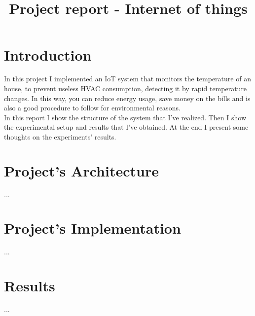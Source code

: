 \documentclass[conference]{IEEEtran}
\begin{document}
\title{Project report - Internet of things}

\author{
}

\maketitle


\section{Introduction}
In this project I implemented an IoT system that monitors the temperature of an house, to prevent useless HVAC consumption, detecting it by rapid temperature changes. In this way, you can reduce energy usage, save money on the bills and is also a good procedure to follow for environmental reasons.\\
In this report I show the structure of the system that I've realized. Then I show the experimental setup and results that I've obtained. At the end I present some thoughts on the experiments' results.


\section{Project’s Architecture}
...

\section{Project’s Implementation}
...

\section{Results}
...

\end{document}
